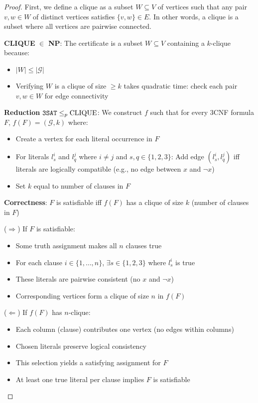 \begin{proof}
	First, we define a clique as a subset $W \subseteq V$ of vertices such that any pair $v,w \in W$ of distinct vertices satisfies $\{v,w\} \in E$. In other words, a clique is a subset where all vertices are pairwise connected.

	\textbf{CLIQUE} $\in$ \textbf{NP}:
	The certificate is a subset $W \subseteq V$ containing a $k$-clique because:
	\begin{itemize}
		\item $|W| \leq |\mathcal{G}|$
		\item Verifying $W$ is a clique of size $\geq k$ takes quadratic time: check each pair $v,w \in W$ for edge connectivity
	\end{itemize}

	\textbf{Reduction} $\kSAT{3} \leq_p \text{CLIQUE}$:
	We construct $f$ such that for every 3CNF formula $F$, $f(F) = (\mathcal{G}, k)$ where:
	\begin{itemize}
		\item Create a vertex for each literal occurrence in $F$
		\item For literals $l_s^i$ and $l_q^j$ where $i \neq j$ and $s,q \in \{1,2,3\}$:
		      Add edge $(l_s^i, l_q^j)$ iff literals are logically compatible
		      (e.g., no edge between $x$ and $\neg x$)
		\item Set $k$ equal to number of clauses in $F$
	\end{itemize}

	\textbf{Correctness}: $F$ is satisfiable iff $f(F)$ has a clique of size $k$ (number of clauses in $F$)

	($\Rightarrow$) If $F$ is satisfiable:
	\begin{itemize}
		\item Some truth assignment makes all $n$ clauses true
		\item For each clause $i \in \{1,\ldots,n\}$, $\exists s \in \{1,2,3\}$ where $l_s^i$ is true
		\item These literals are pairwise consistent (no $x$ and $\neg x$)
		\item Corresponding vertices form a clique of size $n$ in $f(F)$
	\end{itemize}

	($\Leftarrow$) If $f(F)$ has $n$-clique:
	\begin{itemize}
		\item Each column (clause) contributes one vertex (no edges within columns)
		\item Chosen literals preserve logical consistency
		\item This selection yields a satisfying assignment for $F$
		\item At least one true literal per clause implies $F$ is satisfiable
	\end{itemize}
\end{proof}


